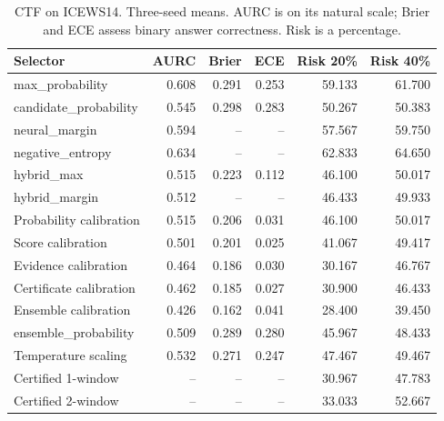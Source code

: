 \begin{table}[H]\centering\small\caption{CTF on ICEWS14. Three-seed means. AURC is on its natural scale; Brier and ECE assess binary answer correctness. Risk is a percentage.}\begin{tabular}{lrrrrr}\toprule Selector & AURC & Brier & ECE & Risk 20\% & Risk 40\%\\\midrule
max\_probability & 0.608 & 0.291 & 0.253 & 59.133 & 61.700\\
candidate\_probability & 0.545 & 0.298 & 0.283 & 50.267 & 50.383\\
neural\_margin & 0.594 & -- & -- & 57.567 & 59.750\\
negative\_entropy & 0.634 & -- & -- & 62.833 & 64.650\\
hybrid\_max & 0.515 & 0.223 & 0.112 & 46.100 & 50.017\\
hybrid\_margin & 0.512 & -- & -- & 46.433 & 49.933\\
Probability calibration & 0.515 & 0.206 & 0.031 & 46.100 & 50.017\\
Score calibration & 0.501 & 0.201 & 0.025 & 41.067 & 49.417\\
Evidence calibration & 0.464 & 0.186 & 0.030 & 30.167 & 46.767\\
Certificate calibration & 0.462 & 0.185 & 0.027 & 30.900 & 46.433\\
Ensemble calibration & 0.426 & 0.162 & 0.041 & 28.400 & 39.450\\
ensemble\_probability & 0.509 & 0.289 & 0.280 & 45.967 & 48.433\\
Temperature scaling & 0.532 & 0.271 & 0.247 & 47.467 & 49.467\\
Certified 1-window & -- & -- & -- & 30.967 & 47.783\\
Certified 2-window & -- & -- & -- & 33.033 & 52.667\\
\bottomrule\end{tabular}\end{table}
